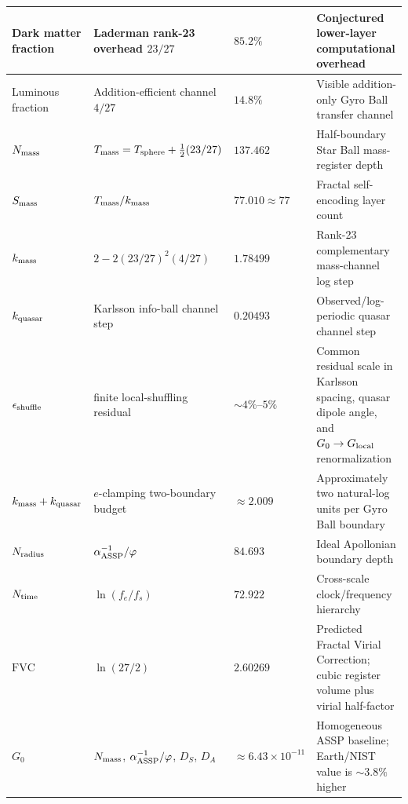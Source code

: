 \documentclass[11pt,a4paper]{article}
\begin{document}
\begin{longtable}{|p{2.8cm}|p{3.2cm}|p{2.2cm}|p{3.2cm}|}
Dark matter fraction   
  & Laderman rank-23 overhead $23/27$                 
  & $85.2\%$
  & Conjectured lower-layer computational overhead \\
\hline

Luminous fraction      
  & Addition-efficient channel $4/27$ 
  & $14.8\%$
  & Visible addition-only Gyro Ball transfer channel \\
\hline

$N_{\rm mass}$         
  & $T_{\rm mass}=T_{\rm sphere}+\frac12(23/27)$               
  & $137.462$
  & Half-boundary Star Ball mass-register depth \\
\hline

$S_{\rm mass}$         
  & $T_{\rm mass}/k_{\rm mass}$       
  & $77.010\approx77$
  & Fractal self-encoding layer count \\
\hline

$k_{\rm mass}$         
  & $2-2(23/27)^2(4/27)$                
  & $1.78499$
  & Rank-23 complementary mass-channel log step \\
\hline

$k_{\rm quasar}$       
  & Karlsson info-ball channel step            
  & $0.20493$
  & Observed/log-periodic quasar channel step~\cite{Karlsson1971,Mal2020} \\
$\epsilon_{\rm shuffle}$       
  & finite local-shuffling residual            
  & $\sim4\%$--$5\%$
  & Common residual scale in Karlsson spacing, quasar dipole angle, and $G_0\to G_{\rm local}$ renormalization \\
\hline

$k_{\rm mass}+k_{\rm quasar}$ 
  & $e$-clamping two-boundary budget
  & $\approx2.009$
  & Approximately two natural-log units per Gyro Ball boundary \\
\hline

$N_{\rm radius}$       
  & $\alpha^{-1}_{\rm ASSP}/\varphi$            
  & $84.693$
  & Ideal Apollonian boundary depth \\
\hline

$N_{\rm time}$         
  & $\ln(f_e/f_s)$                   
  & $72.922$
  & Cross-scale clock/frequency hierarchy \\
\hline

$\mathrm{FVC}$         
  & $\ln(27/2)$                      
  & $2.60269$
  & Predicted Fractal Virial Correction; cubic register volume plus virial half-factor \\
\hline

$G_0$        
  & $N_{\rm mass}$, $\alpha^{-1}_{\rm ASSP}/\varphi$, $D_S$, $D_A$
  & $\approx6.43\times10^{-11}$
  & Homogeneous ASSP baseline; Earth/NIST value is $\sim3.8\%$ higher \\
\hline


\end{longtable}
\end{document}
